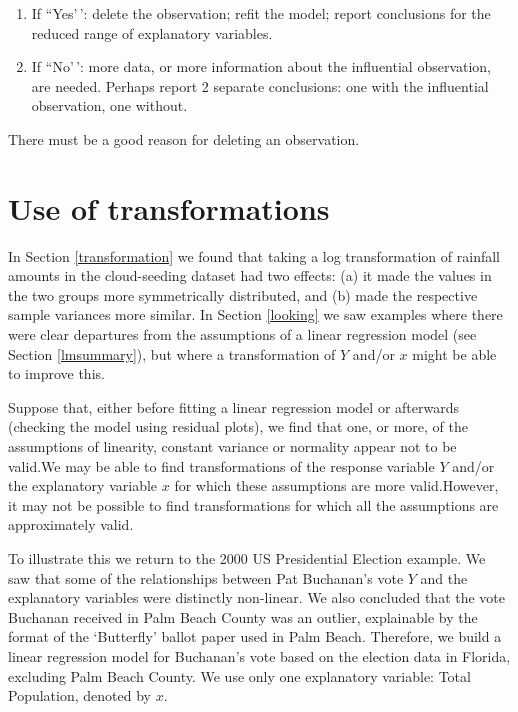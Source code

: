 \documentclass[
  british,
  11pt,
  openany, a4paper]{book}
\providecommand{\tightlist}{%
  \setlength{\itemsep}{0pt}\setlength{\parskip}{0pt}}
\begin{document}
\begin{enumerate}
  \begin{enumerate}
  \def\labelenumii{\alph{enumii}.}
  \tightlist
  \item
    If ``Yes'\,': delete the observation; refit the model; report conclusions for the reduced range of explanatory variables.
  \item
    If ``No'\,': more data, or more information about the influential observation, are needed. Perhaps report 2 separate conclusions: one with the influential observation, one without.
  \end{enumerate}
\end{enumerate}

There must be a good reason for deleting an observation.

\section{Use of transformations}\label{linregtrans}

In Section \ref{transformation} we found that taking a log transformation of rainfall amounts in the cloud-seeding dataset had two effects: (a) it made the values in the two groups more symmetrically distributed, and (b) made the respective sample variances more similar. In Section \ref{looking} we saw examples where there were clear departures from the assumptions of a linear regression model (see Section \ref{lmsummary}), but where a transformation of \(Y\) and/or \(x\) might be able to improve this.

Suppose that, either before fitting a linear regression model or afterwards (checking the model using residual plots), we find that one, or more, of the assumptions of linearity, constant variance or normality appear not to be valid.We may be able to find transformations of the response variable \(Y\) and/or the explanatory variable \(x\) for which these assumptions are more valid.However, it may not be possible to find transformations for which all the assumptions are approximately valid.

To illustrate this we return to the 2000 US Presidential Election example. We saw that some of the relationships between Pat Buchanan's vote \(Y\) and the explanatory variables were distinctly non-linear. We also concluded that the vote Buchanan received in Palm Beach County was an outlier, explainable by the format of the `Butterfly' ballot paper used in Palm Beach. Therefore, we build a linear regression model for Buchanan's vote based on the election data in Florida, excluding Palm Beach County. We use only one explanatory variable: Total Population, denoted by \(x\).
\end{document}
